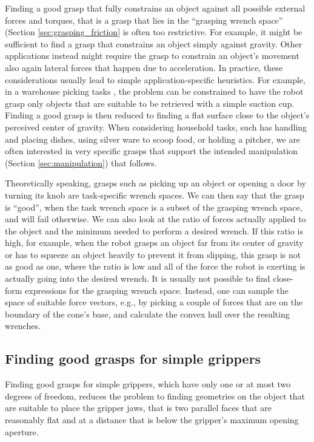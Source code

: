 Finding a good grasp that fully constrains an object against all possible external forces and torques, that is a grasp that lies in the ``grasping wrench space'' (Section \ref{sec:grasping_friction} is often too restrictive. For example, it might be sufficient to find a grasp that constrains an object simply against gravity. Other applications instead might require the grasp to constrain an object's movement also again lateral forces that happen due to acceleration. In practice, these considerations usually lead to simple application-specific heuristics. For example, in a warehouse picking tasks \cite{correll2016analysis}, the problem can be constrained to have the robot grasp only objects that are suitable to be retrieved with a simple suction cup. Finding a good grasp is then reduced to finding a flat surface close to the object's perceived center of gravity. When considering household tasks, such has handling and placing dishes, using silver ware to scoop food, or holding a pitcher, we are often interested in very specific grasps that support the intended manipulation (Section \ref{sec:manipulation}) that follows. 

Theoretically speaking, grasps such as picking up an object or opening a door by turning its knob are task-specific wrench spaces. We can then say that the grasp is ``good'', when the task wrench space is a subset of the grasping wrench space, and will fail otherwise. We can also look at the ratio of forces actually applied to the object and the minimum needed to perform a desired wrench. If this ratio is high, for example, when the robot grasps an object far from its center of gravity or has to squeeze an object heavily to prevent it from slipping, this grasp is not as good as one, where the ratio is low and all of the force the robot is exerting is actually going into the desired wrench. It is usually not possible to find close-form expressions for the grasping wrench space. Instead, one can sample the space of suitable force vectors, e.g., by picking a couple of forces that are on the boundary of the cone's base, and calculate the convex hull over the resulting wrenches.

\subsection{Finding good grasps for simple grippers}
Finding good grasps for simple grippers, which have only one or at most two degrees of freedom, reduces the problem to finding geometries on the object that are suitable to place the gripper jaws, that is two parallel faces that are reasonably flat and at a distance that is below the gripper's maximum opening aperture. 

